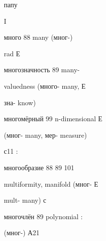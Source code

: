 \begin{minipage}[t]{0.475\textwidth}
\noindent папу\par
\noindent I\par
\noindent много 88 many (мног-)\par
\noindent rad Е\par
\noindent многозначность 89 many-\par
\noindent valuedness (много- many, Е\par
\noindent зна- know)\par
\noindent многомёрный 99 n-dimensional Е\par
\noindent (мног- many, мер- measure)\par
\noindent с11 :\par
\noindent многообразие 88 89 101\par
\noindent multiformity, manifold (мног- Е\par
\noindent mult- many) с\par
\noindent многочлён 89 polynomial :\par
\noindent (мног-) А21\par
\end{minipage}\hfill
